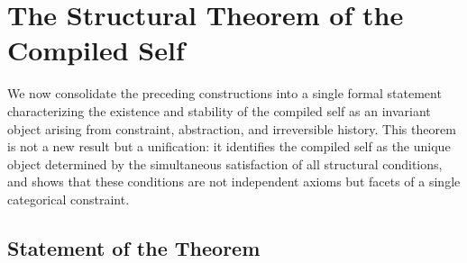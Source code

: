 \documentclass[12pt, a4paper]{article}
\theoremstyle{plain}
\theoremstyle{definition}
\theoremstyle{remark}
\begin{document}
\section{The Structural Theorem of the Compiled Self}

We now consolidate the preceding constructions into a single formal statement characterizing the existence and stability of the compiled self as an invariant object arising from constraint, abstraction, and irreversible history. This theorem is not a new result but a unification: it identifies the compiled self as the unique object determined by the simultaneous satisfaction of all structural conditions, and shows that these conditions are not independent axioms but facets of a single categorical constraint.

\subsection{Statement of the Theorem}
\end{document}

